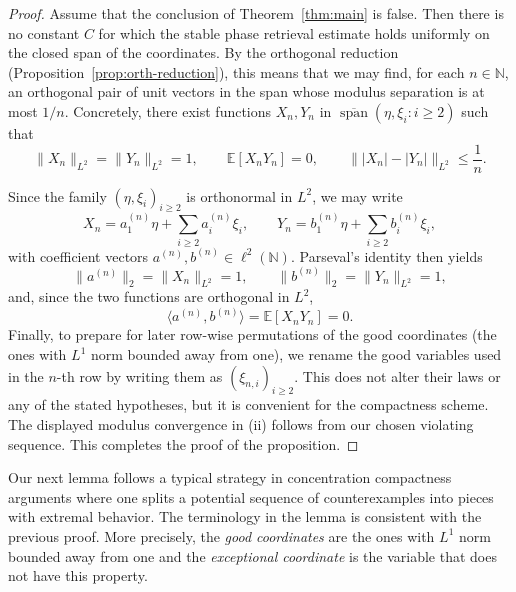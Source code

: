 \documentclass[11pt]{amsart}
\numberwithin{equation}{section}
\theoremstyle{definition}
\theoremstyle{remark}
\newcommand{\E}{\mathbb E}
\newcommand{\N}{\mathbb N}
\newcommand{\Span}{\operatorname{span}}
\newcommand{\norm}[1]{\lVert #1 \rVert}
\newcommand{\ip}[2]{\langle #1,#2\rangle}
\begin{document}
\begin{proof}
Assume that the conclusion of Theorem~\ref{thm:main} is false.  Then there is
no constant $C$ for which the stable phase retrieval estimate holds uniformly
on the closed span of the coordinates.  By the orthogonal reduction
(Proposition~\ref{prop:orth-reduction}), this means that we may find, for each
$n\in\N$, an orthogonal pair of unit vectors in the span whose modulus separation is
at most $1/n$.  Concretely, there exist functions $X_n,Y_n$ in
$\overline{\Span}(\eta,\xi_i:i\ge2)$ such that
\[
\norm{X_n}_{L^2}=\norm{Y_n}_{L^2}=1,
\qquad
\E[X_nY_n]=0,
\qquad
\norm{|X_n|-|Y_n|}_{L^2}\le \frac1n.
\]

\noindent Since the family $(\eta,\xi_i)_{i\ge2}$ is orthonormal in $L^2$, we may write
\[
X_n=a_1^{(n)}\eta+\sum_{i\ge2}a_i^{(n)}\xi_i,
\qquad
Y_n=b_1^{(n)}\eta+\sum_{i\ge2}b_i^{(n)}\xi_i,
\]
with coefficient vectors $a^{(n)},b^{(n)}\in\ell^2(\N)$.  Parseval's identity
then yields
\[
\norm{a^{(n)}}_2=\norm{X_n}_{L^2}=1,
\qquad
\norm{b^{(n)}}_2=\norm{Y_n}_{L^2}=1,
\]
and, since the two functions are orthogonal in $L^2$,
\[
\ip{a^{(n)}}{b^{(n)}}=\E[X_nY_n]=0.
\]
Finally, to prepare for later row-wise permutations of the good coordinates (the ones with $L^1$ norm bounded away from one), we
rename the good variables used in the $n$-th row by writing them as
$(\xi_{n,i})_{i\ge2}$.  This does not alter their laws or any of the stated
hypotheses, but it is convenient for the compactness scheme.  The displayed
modulus convergence in (ii) follows from our chosen violating sequence.  This completes the proof of the
proposition.
\end{proof}
Our next lemma follows a typical strategy in concentration compactness arguments where one splits a potential sequence of counterexamples into 
pieces with extremal behavior. The terminology in the lemma is consistent with the previous proof. More precisely, the \emph{good coordinates} are the ones with $L^1$ norm bounded away from one and the \emph{exceptional coordinate} is the variable that does not have this property.
\end{document}
